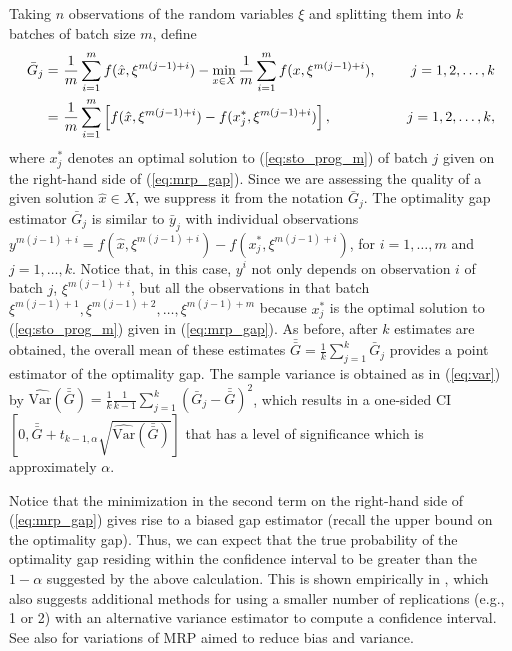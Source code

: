 \documentclass[12pt]{article}
\newcommand{\varh}[1]{\widehat{\mathrm{Var}} \left( #1 \right)}
\newcommand{\X}{X}
\newcommand{\x}{x}
\newcommand{\xh}{{\hat{\x}}}
\newcommand{\xs}{\x^*}
\newcommand{\xit}{\xi}
\newcommand{\gb}{\bar{G}}
\newcommand{\gbb}{\bar{\gb}}
\newcommand{\yb}{\bar{y}}
\begin{document}
Taking $n$ observations of the random variables $\xit$ and splitting them into $k$ batches of batch size $m$, define 
\begin{align} 
	\gb_j =\  & \frac{1}{m} \sum_{i = 1}^{m} f(\xh, \xit^{m(j-1)+i}) - \min_{\x \in X} \frac{1}{m} \sum_{i=1}^{m} f(\x, \xit^{m(j-1)+i}),& \ \ \ \ j = 1,2, \dots, k \label{eq:mrp_gap}\\
         =\  & \frac{1}{m} \sum_{i = 1}^{m} \left[ f(\xh, \xit^{m(j-1)+i}) -  f(\xs_j, \xit^{m(j-1)+i}) \right],& \ \ \ \ j = 1,2, \dots, k, \notag
\end{align}
where $\xs_j$ denotes an optimal solution to (\ref{eq:sto_prog_m}) of batch $j$ given on the right-hand side of (\ref{eq:mrp_gap}).    
Since we are assessing the quality of a given solution $\xh \in \X$, we suppress it from the notation $\gb_j$.
The optimality gap estimator $\gb_j$ is similar to $\yb_j$ with individual observations $y^{m(j-1)+i} = f(\xh,\xit^{m(j-1)+i}) - f(\xs_j,\xit^{m(j-1)+i})$, for $i=1,\ldots,m$ and $j=1,\ldots, k$.
Notice that, in this case, $y^i$ not only depends on observation $i$ of batch $j$, $\xit^{m(j-1)+i}$, but all the observations in that batch $\xit^{m(j-1)+1},\xit^{m(j-1)+2},\ldots,\xit^{m(j-1)+m}$ because $\xs_j$ is the optimal solution to (\ref{eq:sto_prog_m}) given in (\ref{eq:mrp_gap}).   
As before, after $k$ estimates are obtained, the overall mean of these estimates $\gbb = \frac{1}{k} \sum_{j=1}^k \gb_j$ provides a point estimator of the optimality gap.  
The sample variance is obtained as in (\ref{eq:var}) by $\varh{\gbb} = \frac{1}{k} \frac{1}{k-1} \sum_{j=1}^k (\gb_j - \gbb)^2$, which results in a one-sided CI $\left[0, \gbb + t_{k-1,\alpha} \sqrt{\varh{\gbb}} \right]$ that has a level of significance which is approximately $\alpha$.

Notice that the minimization in the second term on the right-hand side of (\ref{eq:mrp_gap}) gives rise to a biased gap estimator (recall the upper bound on the optimality gap).  
Thus, we can expect that the true probability of the optimality gap residing within the confidence interval to be greater than the $1 - \alpha$ suggested by the above calculation.  
This is shown empirically in \citep{Bayraksan2006}, which also suggests additional methods for using a smaller number of replications (e.g., 1 or 2) with an alternative variance estimator to compute a confidence interval.  
See also \citep{bayraksan_morton_09,partani2006jackknife,partani_07} for variations of MRP aimed to reduce bias and variance.
\end{document}

